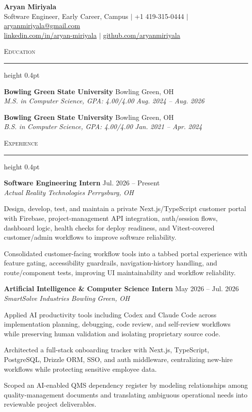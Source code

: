 \documentclass[letterpaper,11pt]{article}
\newcommand{\resumesection}[1]{%
  \par\vspace{2pt}%
  {\large\scshape #1}\par\vspace{2pt}%
  \hrule height 0.4pt\vspace{2pt}%
}
\newcommand{\resumeSubheading}[4]{
  \textbf{#1} \hfill #2\\
  \textit{#3} \hfill \textit{#4}
}
\begin{document}
\begin{center}
  {\LARGE \textbf{Aryan Miriyala}}\\[-1pt]
  \small
  Software Engineer, Early Career, Campus $|$
  +1 419-315-0444 $|$
  \href{mailto:aryanmiriyala@gmail.com}{aryanmiriyala@gmail.com}\\[-1pt]
  \href{https://www.linkedin.com/in/aryan-miriyala-7788a21b6/}{linkedin.com/in/aryan-miriyala} $|$
  \href{https://github.com/aryanmiriyala}{github.com/aryanmiriyala}
\end{center}\vspace{-10pt}

\resumesection{Education}
\resumeSubheading
{Bowling Green State University}{Bowling Green, OH}
{M.S. in Computer Science, GPA: 4.00/4.00}{Aug. 2024 -- Aug. 2026}

\resumeSubheading
{Bowling Green State University}{Bowling Green, OH}
{B.S. in Computer Science, GPA: 4.00/4.00}{Jan. 2021 -- Apr. 2024}

\resumesection{Experience}
\resumeSubheading
{Software Engineering Intern}{Jul. 2026 -- Present}
{Actual Reality Technologies}{Perrysburg, OH}
\begin{tightitemize}
  \item Design, develop, test, and maintain a private Next.js/TypeScript customer portal with Firebase, project-management API integration, auth/session flows, dashboard logic, health checks for deploy readiness, and Vitest-covered customer/admin workflows to improve software reliability.
  \item Consolidated customer-facing workflow tools into a tabbed portal experience with feature gating, accessibility guardrails, navigation-history handling, and route/component tests, improving UI maintainability and workflow reliability.
\end{tightitemize}

\resumeSubheading
{Artificial Intelligence \& Computer Science Intern}{May 2026 -- Jul. 2026}
{SmartSolve Industries}{Bowling Green, OH}
\begin{tightitemize}
  \item Applied AI productivity tools including Codex and Claude Code across implementation planning, debugging, code review, and self-review workflows while preserving human validation and isolating proprietary source code.
  \item Architected a full-stack onboarding tracker with Next.js, TypeScript, PostgreSQL, Drizzle ORM, SSO, and auth middleware, centralizing new-hire workflows while protecting sensitive employee data.
  \item Scoped an AI-enabled QMS dependency register by modeling relationships among quality-management documents and translating ambiguous operational needs into reviewable project deliverables.
\end{tightitemize}
\end{document}
